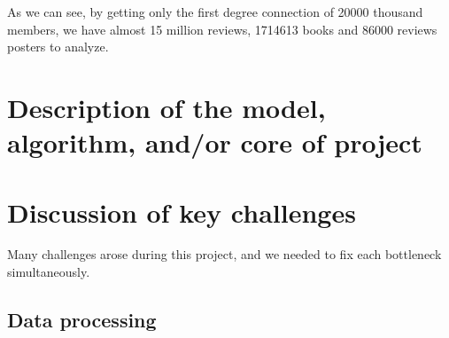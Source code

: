 \documentclass[11pt]{article}
\begin{document}

As we can see, by getting only the first degree connection of 20000 thousand members, we have almost 15 million reviews, 1714613 books and 86000 reviews posters to analyze.













\section{Description of the model, algorithm, and/or core of project}


\section{Discussion of key challenges}

Many challenges arose during this project, and we needed to fix each bottleneck simultaneously.

\subsection{Data processing}
\end{document}
